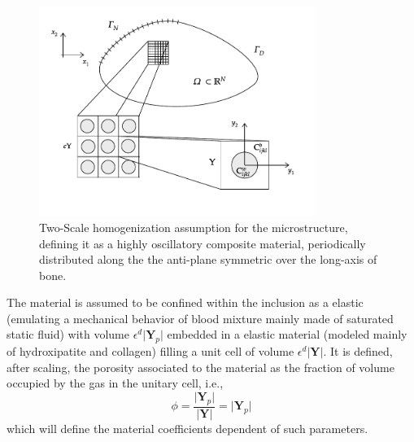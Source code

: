 \begin{figure}[!h]
	\centering
	\includegraphics[width=0.8\textwidth]{images/HomSchemes/HomBasicScheme.pdf}
	\caption{Two-Scale homogenization assumption for the microstructure, defining it as a highly oscillatory composite material, periodically distributed along the the anti-plane symmetric over the long-axis of bone.}
	\label{HomBasicScheme}
\end{figure}

\begin{rem}
The material is assumed to be confined within the inclusion as a elastic (emulating a mechanical behavior of blood mixture mainly made of saturated static fluid) with volume $\epsilon^d \vert \mathbf{Y}_p \vert$ embedded in a elastic material (modeled mainly of hydroxipatite and collagen) filling a unit cell of volume $\epsilon^d \vert \mathbf{Y} \vert$.
It is defined, after scaling, the porosity associated to the material as the fraction of volume occupied by the gas in the unitary cell, i.e., 
\begin{equation*}
\phi = \frac{\vert \mathbf{Y}_p \vert}{\vert \mathbf{Y} \vert} = \vert \mathbf{Y}_p \vert
\end{equation*}
which will define the material coefficients dependent of such parameters.
\end{rem}

